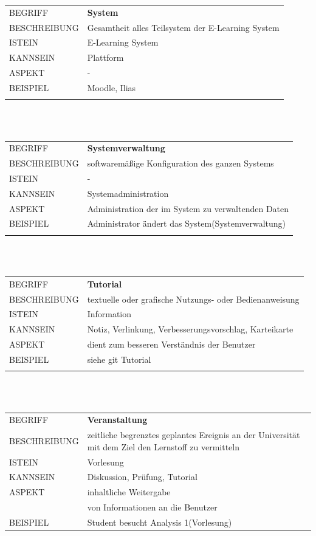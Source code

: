 \documentclass[12pt,a4paper]{article}
\begin{document}
\begin{tabular}{l p{12cm}} 
BEGRIFF 	 & \textbf{System} \\ 
BESCHREIBUNG & Gesamtheit alles Teilsystem der E-Learning System \\ 
ISTEIN   	 & E-Learning System\\
KANNSEIN 	 & Plattform\\ 
ASPEKT   	 & -\\
BEISPIEL 	 & Moodle, Ilias\\\\
\hline
\end{tabular}\\\\  

\begin{tabular}{l p{12cm}}
BEGRIFF 	 & \textbf{Systemverwaltung} \\ 
BESCHREIBUNG & softwaremäßige Konfiguration des ganzen Systems\\ 
ISTEIN   	 & -\\
KANNSEIN 	 & Systemadministration\\ 
ASPEKT   	 & Administration der im System zu verwaltenden Daten\\
BEISPIEL 	 & Administrator ändert das System(Systemverwaltung)\\\\
\hline
\end{tabular}\\\\  

\begin{tabular}{l p{12cm}}
BEGRIFF 	 & \textbf{Tutorial} \\ 
BESCHREIBUNG & textuelle oder grafische Nutzungs- oder 							   Bedienanweisung \\ 
ISTEIN   	 & Information\\
KANNSEIN 	 & Notiz, Verlinkung, Verbesserungsvorschlag, Karteikarte\\ 
ASPEKT   	 & dient zum besseren Verständnis der Benutzer\\
BEISPIEL 	 & siehe git Tutorial\\\\
\hline
\end{tabular}\\\\  

\begin{tabular}{l p{12cm}}
BEGRIFF 	 & \textbf{Veranstaltung} \\ 
BESCHREIBUNG & zeitliche begrenztes geplantes Ereignis an der Universität mit 				   dem Ziel den Lernstoff zu vermitteln\\ 
ISTEIN   	 & Vorlesung\\
KANNSEIN 	 & Diskussion, Prüfung, Tutorial\\ 
ASPEKT   	 & inhaltliche Weitergabe\\
			 & von Informationen an die Benutzer\\
BEISPIEL 	 & Student besucht Analysis 1(Vorlesung)\\
\hline
\end{tabular}\\\\  
\end{document}
